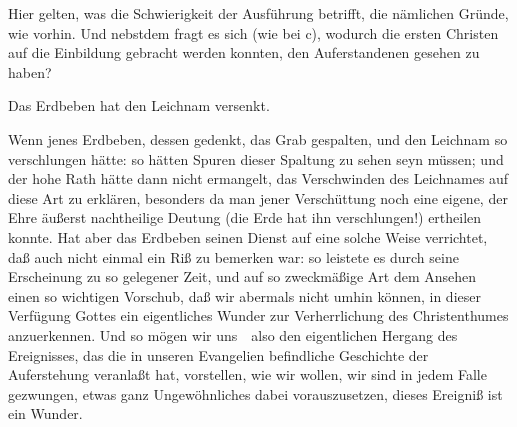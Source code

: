 \begin{aufza}
\begin{aufzb}
Hier gelten, was die Schwierigkeit der Ausführung betrifft, die nämlichen Gründe, wie vorhin. Und nebstdem fragt es sich (wie bei c), wodurch die ersten Christen auf die Einbildung gebracht werden konnten, den Auferstandenen gesehen zu haben? \usw
\item Das Erdbeben hat den Leichnam  versenkt. \par
Wenn jenes Erdbeben, dessen  gedenkt, das Grab gespalten, und den Leichnam so verschlungen hätte: so hätten Spuren dieser Spaltung zu sehen seyn müssen; und der hohe Rath hätte dann nicht ermangelt, das Verschwinden des Leichnames auf diese Art zu erklären, besonders da man jener Verschüttung noch eine eigene, der Ehre  äußerst nachtheilige Deutung (die Erde hat ihn verschlungen!) ertheilen konnte. Hat aber das Erdbeben seinen Dienst auf eine solche Weise verrichtet, daß auch nicht einmal ein Riß zu bemerken war: so leistete es durch seine Erscheinung zu so gelegener Zeit, und auf so zweckmäßige Art dem Ansehen  einen so wichtigen Vorschub, daß wir abermals nicht umhin können, in dieser Verfügung Gottes ein eigentliches Wunder zur Verherrlichung des Christenthumes anzuerkennen. Und so mögen wir uns~\ also den eigentlichen Hergang des Ereignisses, das die in unseren Evangelien befindliche Geschichte der Auferstehung  veranlaßt hat, vorstellen, wie wir wollen, wir sind in jedem Falle gezwungen, etwas ganz Ungewöhnliches dabei vorauszusetzen, dieses Ereigniß ist ein Wunder.
\end{aufzb}
\end{aufza}

